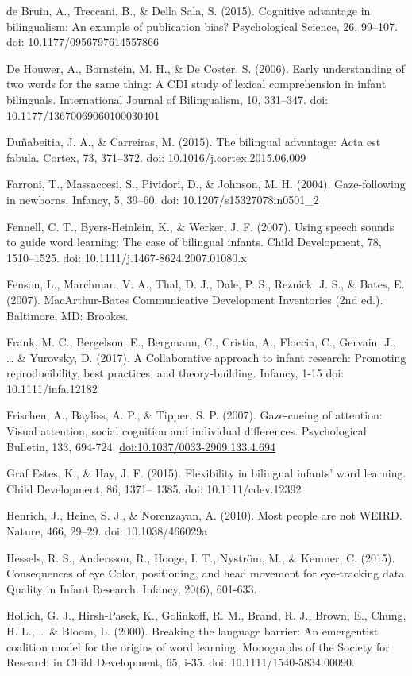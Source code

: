 \documentclass[,man,floatsintext]{apa6}
\begin{document}
de Bruin, A., Treccani, B., \& Della Sala, S. (2015). Cognitive advantage in bilingualism: An example of publication bias? Psychological Science, 26, 99--107. doi: 10.1177/0956797614557866

De Houwer, A., Bornstein, M. H., \& De Coster, S. (2006). Early understanding of two words for the same thing: A CDI study of lexical comprehension in infant bilinguals. International Journal of Bilingualism, 10, 331--347. doi: 10.1177/13670069060100030401

Duñabeitia, J. A., \& Carreiras, M. (2015). The bilingual advantage: Acta est fabula. Cortex, 73, 371--372. doi: 10.1016/j.cortex.2015.06.009

Farroni, T., Massaccesi, S., Pividori, D., \& Johnson, M. H. (2004). Gaze-following in newborns. Infancy, 5, 39--60. doi: 10.1207/s15327078in0501\_2

Fennell, C. T., Byers-Heinlein, K., \& Werker, J. F. (2007). Using speech sounds to guide word learning: The case of bilingual infants. Child Development, 78, 1510--1525. doi: 10.1111/j.1467-8624.2007.01080.x

Fenson, L., Marchman, V. A., Thal, D. J., Dale, P. S., Reznick, J. S., \& Bates, E. (2007). MacArthur-Bates Communicative Development Inventories (2nd ed.). Baltimore, MD: Brookes.

Frank, M. C., Bergelson, E., Bergmann, C., Cristia, A., Floccia, C., Gervain, J., \ldots{} \& Yurovsky, D. (2017). A Collaborative approach to infant research: Promoting reproducibility, best practices, and theory‐building. Infancy, 1-15 doi: 10.1111/infa.12182

Frischen, A., Bayliss, A. P., \& Tipper, S. P. (2007). Gaze-cueing of attention: Visual attention, social cognition and individual differences. Psychological Bulletin, 133, 694-724. \url{doi:10.1037/0033-2909.133.4.694}

Graf Estes, K., \& Hay, J. F. (2015). Flexibility in bilingual infants' word learning. Child Development, 86, 1371-- 1385. doi: 10.1111/cdev.12392

Henrich, J., Heine, S. J., \& Norenzayan, A. (2010). Most people are not WEIRD. Nature, 466, 29--29. doi: 10.1038/466029a

Hessels, R. S., Andersson, R., Hooge, I. T., Nyström, M., \& Kemner, C. (2015). Consequences of eye Color, positioning, and head movement for eye‐tracking data Quality in Infant Research. Infancy, 20(6), 601-633.

Hollich, G. J., Hirsh-Pasek, K., Golinkoff, R. M., Brand, R. J., Brown, E., Chung, H. L., \ldots{} \& Bloom, L. (2000). Breaking the language barrier: An emergentist coalition model for the origins of word learning. Monographs of the Society for Research in Child Development, 65, i-35. doi: 10.1111/1540-5834.00090.
\end{document}

